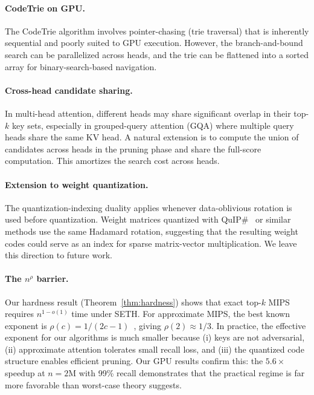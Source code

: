 \documentclass[10pt,twocolumn]{article}
\theoremstyle{definition}
\begin{document}
\paragraph{CodeTrie on GPU.}
The CodeTrie algorithm involves pointer-chasing (trie traversal) that is
inherently sequential and poorly suited to GPU execution.  However, the
branch-and-bound search can be parallelized across heads, and the trie can be
flattened into a sorted array for binary-search-based navigation.

\paragraph{Cross-head candidate sharing.}
In multi-head attention, different heads may share significant overlap in their
top-$k$ key sets, especially in grouped-query attention (GQA) where multiple
query heads share the same KV head.  A natural extension is to compute the union
of candidates across heads in the pruning phase and share the full-score
computation.  This amortizes the search cost across heads.

\paragraph{Extension to weight quantization.}
The quantization-indexing duality applies whenever data-oblivious rotation is
used before quantization.  Weight matrices quantized with
QuIP\#~\cite{quipsharp2024} or similar methods use the same Hadamard rotation,
suggesting that the resulting weight codes could serve as an index for sparse
matrix-vector multiplication.  We leave this direction to future work.

\paragraph{The $n^{\rho}$ barrier.}
Our hardness result (Theorem~\ref{thm:hardness}) shows that exact top-$k$ MIPS
requires $n^{1-o(1)}$ time under SETH.  For approximate MIPS, the best known
exponent is $\rho(c) = 1/(2c - 1)$~\cite{andoni2015optimal}, giving
$\rho(2) \approx 1/3$.  In practice, the effective exponent for our algorithms
is much smaller because (i) keys are not adversarial, (ii) approximate attention
tolerates small recall loss, and (iii) the quantized code structure enables
efficient pruning.  Our GPU results confirm this: the $5.6\times$ speedup at
$n = 2$M with 99\% recall demonstrates that the practical regime is far more
favorable than worst-case theory suggests.
\end{document}
